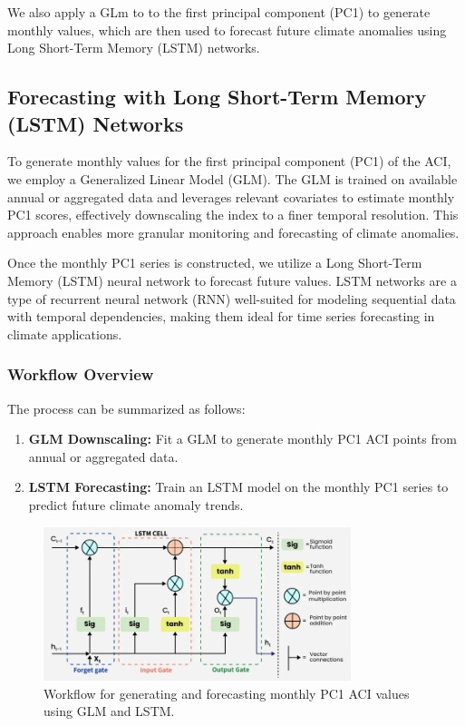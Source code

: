 \documentclass[12pt,a4paper]{report}
\begin{document}
We also apply a GLm to to the first principal component (PC1) to generate monthly values, 
which are then used to forecast future climate anomalies using Long Short-Term Memory (LSTM) networks.
\subsection{Forecasting with Long Short-Term Memory (LSTM) Networks}
To generate monthly values for the first principal component (PC1) of the ACI, we employ a Generalized Linear Model (GLM). 
The GLM is trained on available annual or aggregated data and leverages relevant covariates to estimate monthly PC1 scores, 
effectively downscaling the index to a finer temporal resolution. This approach enables more granular monitoring and forecasting of climate anomalies.

Once the monthly PC1 series is constructed, we utilize a Long Short-Term Memory (LSTM) neural network to forecast future values. 
LSTM networks are a type of recurrent neural network (RNN) well-suited for modeling sequential data with temporal dependencies, 
making them ideal for time series forecasting in climate applications.

\subsubsection*{Workflow Overview}
The process can be summarized as follows:
\begin{enumerate}
    \item \textbf{GLM Downscaling:} Fit a GLM to generate monthly PC1 ACI points from annual or aggregated data.
    \item \textbf{LSTM Forecasting:} Train an LSTM model on the monthly PC1 series to predict future climate anomaly trends.
\end{enumerate}

\begin{figure}[H]
    \centering
    \includegraphics[width=0.8\textwidth]{aci_glm_lstm_workflow.png}
    \caption{Workflow for generating and forecasting monthly PC1 ACI values using GLM and LSTM.}
    \label{fig:aci_glm_lstm_workflow}
\end{figure}
\end{document}
